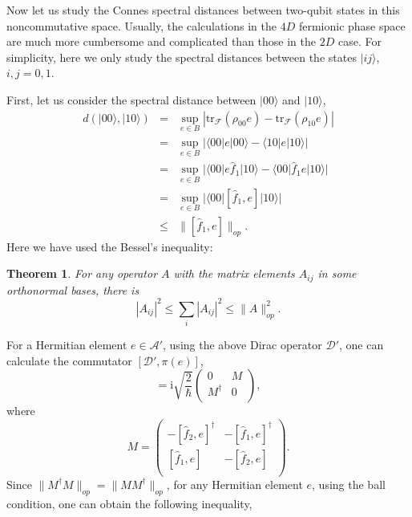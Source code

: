 \documentclass[a4paper,12pt]{article}
\newtheorem{theorem}{Theorem}
\begin{document}
Now let us study the Connes spectral distances between two-qubit states in this noncommutative space.
Usually, the calculations in the $4D$ fermionic phase space are much more cumbersome and complicated than those in the $2D$ case.
For simplicity, here we only study the spectral distances between the states $|ij\rangle$, $i,j=0,1$.

First, let us consider the spectral distance between $|00\rangle$ and $|10\rangle$,
\begin{eqnarray}\label{d0010}
	d(|00\rangle, |10\rangle)&=&\sup_{e\in B}|\mathrm{tr}_\mathcal{F}(\rho_{00} e)-\mathrm{tr}_\mathcal{F}(\rho_{10} e)|\nonumber\\
	&=&\sup_{e\in B}|\langle 00|e|00\rangle-\langle 10|e|10\rangle|\nonumber\\
	&=&\sup_{e\in B}|\langle 00|e\hat{f}_1|10\rangle-\langle 00|\hat{f}_1 e|10\rangle|\nonumber\\
	&=&\sup_{e\in B}|\langle 00|[\hat{f}_1,e]|10\rangle|\nonumber\\
	&\leqslant&\big\|[\hat{f}_1,e]\big\|_{op}.
\end{eqnarray}
Here we have used the Bessel's inequality:
\begin{theorem}\cite{Revisiting}
	For any operator $A$ with the matrix elements $A_{ij}$ in some orthonormal bases, there is
	\begin{equation}\label{bi}
		|A_{ij}|^2\leqslant\sum_i|A_{ij}|^2\leqslant\|A\|_{op}^2.
	\end{equation}
\end{theorem}
For a Hermitian element $e\in \mathcal{A}'$,
using the above Dirac operator $\mathcal{D}'$, one can calculate the commutator $[\mathcal{D}',\pi(e)]$,
\begin{equation}
	[\mathcal{D}',\pi(e)]
	=\mathrm{i}\sqrt{\frac{2}{\hbar}}\left(
	\begin{array}{cc}
		0 & M \\
		M^\dag & 0 \\
	\end{array}\right),
\end{equation}
where
\begin{equation}\label{d1d}
	M=\left(
	\begin{array}{cc}
		-[\hat{f}_2,e]^\dag & -[\hat{f}_1,e]^\dag \\[0.2em]
		[\hat{f}_1,e] & -[\hat{f}_2,e] \\
	\end{array}\right).
\end{equation}
Since $\|M^\dag M\|_{op}=\|M M^\dag\|_{op}$, for any Hermitian element $e$, using the ball condition, one can obtain the following inequality,
\end{document}
